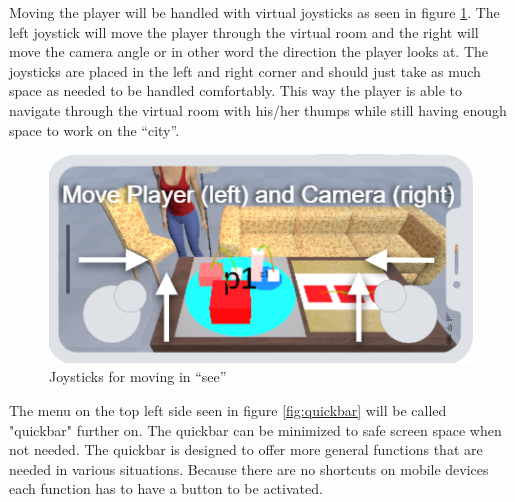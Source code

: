 Moving the player will be handled with virtual joysticks as seen in figure \ref{fig:joystick}.
The left joystick will move the player through the virtual room and the right will move the camera angle or in other word the direction the player looks at.
The joysticks are placed in the left and right corner and should just take as much space as needed to be handled comfortably.
This way the player is able to navigate through the virtual room with his/her thumps while still having enough space to work on the \enquote{\gls{city}}.

\begin{figure}[htb]
    \centering
    \includegraphics[width=1\textwidth]{Concept/img/joystick.png}
    \caption{Joysticks for moving in \enquote{\gls{see}}}\label{fig:joystick}
\end{figure}

The menu on the top left side seen in figure \ref{fig:quickbar} will be called "quickbar" further on. 
The quickbar can be minimized to safe screen space when not needed. 
The quickbar is designed to offer more general functions that are needed in various situations.
Because there are no shortcuts on mobile devices each function has to have a button to be activated.

